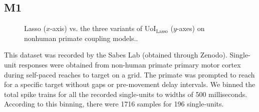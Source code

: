 \documentclass[11pt]{article}
\begin{document}
\subsection{M1}
\begin{figure}
	\vspace{-25pt}
	\centering
	\caption{Lasso ($x$-axis) vs. the three variants of UoI$_{\text{Lasso}}$ ($y$-axes) on nonhuman primate coupling models..}
	\label{fig:nhp}
\end{figure}
This dataset was recorded by the Sabes Lab (obtained through Zenodo). Single-unit responses were obtained from non-human primate primary motor cortex during self-paced reaches to target on a grid. The primate was prompted to reach for a specific target without gaps or pre-movement delay intervals. We binned the total spike trains for all the recorded single-units to widths of 500 milliseconds. According to this binning, there were 1716 samples for 196 single-units.
\end{document}
